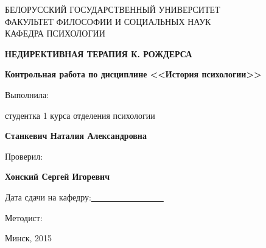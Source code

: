 \documentclass{../../common/thesisbyxetex}
\begin{document}

\begin{titlepage}
\newpage

\begin{center}
\large \uppercase{Белорусский государственный университет \\
факультет философии и социальных наук\\
кафедра психологии}
\end{center}
 
\vspace{12em}

\renewcommand{\mkgostheading}[1]{#1}

\begin{center}
\Large \uppercase{\textbf{Недирективная терапия К. Рождерса}}
\end{center}

\begin{center}
\textbf{Контрольная работа по дисциплине <<История психологии>>}
\end{center}

\vspace{11em}
 
\begin{flushright}
Выполнила:

\vspace{0.25em}

студентка 1 курса отделения психологии

\textbf{Станкевич Наталия Александровна}

\vspace{2em}

Проверил:

\vspace{0.25em}

\textbf{Хонский Сергей Игоревич}

\end{flushright}

\vspace{2em}
Дата сдачи на кафедру:\underline{~~~~~~~~~~~~~~~~~}
\vspace{0.25em}

Методист:
 
\vspace{\fill}

\begin{center}
Минск, 2015
\end{center}

\end{titlepage} 
\end{document}
